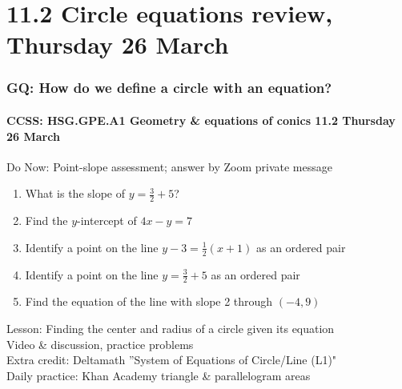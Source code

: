\documentclass{beamer}
\begin{document}
\section{11.2 Circle equations review, Thursday 26 March} 
\frame
{
  \frametitle{GQ: How do we define a circle with an equation?}
  \framesubtitle{CCSS: HSG.GPE.A1 Geometry \& equations of conics \hfill \alert{11.2 Thursday 26 March}}

  \begin{block}{Do Now: Point-slope assessment; answer by Zoom private message}
    \begin{enumerate}
      \item What is the slope of $y=\frac{3}{2}+5$?
      \item Find the $y$-intercept of $4x-y=7$
      \item Identify a point on the line $y-3=\frac{1}{2}(x+1)$ as an ordered pair
      \item Identify a point on the line $y=\frac{3}{2}+5$ as an ordered pair
      \item Find the equation of the line with slope 2 through $(-4,9)$
    \end{enumerate}

    \end{block}
    Lesson: Finding the center and radius of a circle given its equation \\
    Video \& discussion, practice problems  \\
    Extra credit: Deltamath ''System of Equations of Circle/Line (L1)" \\[0.25cm]
    Daily practice: Khan Academy triangle \& parallelogram areas
}
\end{document}
